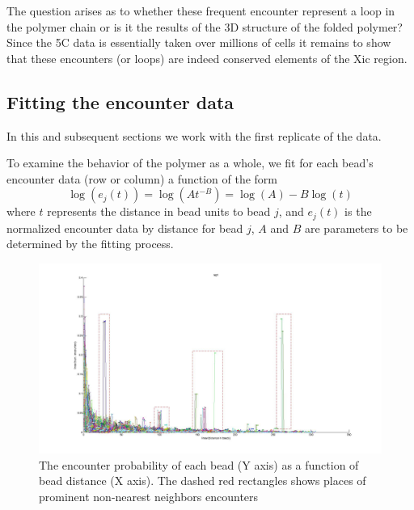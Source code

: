 \documentclass[12pt]{paper}
\begin{document}
The question arises as to whether these frequent encounter represent a loop in the polymer chain or is it the results of the 3D structure of the folded polymer? Since the 5C data is essentially taken over millions of cells it remains to show that these encounters (or loops) are indeed conserved elements of the Xic region.

\subsection{Fitting the encounter data}
In this and subsequent sections we work with the first replicate of the data.

To examine the behavior of the polymer as a whole, we fit for each bead's encounter data 
(row or column) a function of the form 
\begin{equation}\label{fitModel}
\log(e_j(t))= \log(At^{-B})= \log(A)-B\log(t)
\end{equation}
where $t$ represents the distance in bead units to bead $j$, and $e_j(t)$ is the normalized encounter data by distance for bead $j$, $A$ and $B$ are parameters to be determined by the fitting process. 

\begin{figure}[H]
\includegraphics*[scale=0.2]{EncounterFrequenciesByDistanceRep1}
\caption{\scriptsize{The encounter probability of each bead (Y axis) as a function of bead distance (X axis). The dashed red rectangles shows places of prominent non-nearest neighbors encounters}}
\end{figure}
\end{document}
